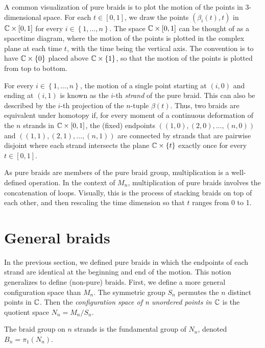 A common visualization of pure braids is to plot the motion of the points in 3-dimensional space. For each $t\in [0,1]$, we draw the points $\left( \beta_i(t),t \right)$ in $\mathbb{C}\times[0,1]$ for every $i\in\left\{ 1,\dots,n \right\}$. The space $\mathbb{C}\times[0,1]$ can be thought of as a spacetime diagram, where the motion of the points is plotted in the complex plane at each time $t$, with the time being the vertical axis. The convention is to have $\mathbb{C}\times\left\{ 0 \right\}$ placed above $\mathbb{C}\times\left\{ 1 \right\}$, so that the motion of the points is plotted from top to bottom.


For every $i\in\left\{ 1,\dots,n \right\}$, the motion of a single point starting at $(i,0)$ and ending at $(i,1)$ is known as the $i$-th \textit{strand} of the pure braid. This can also be described by the $i$-th projection of the $n$-tuple $\beta(t)$. Thus, two braids are equivalent under homotopy if, for every moment of a continuous deformation of the $n$ strands in $\mathbb{C}\times [0,1]$, the (fixed) endpoints $((1,0),(2,0),\dots,(n,0))$ and $((1,1),(2,1),\dots,(n,1))$ are connected by strands that are pairwise disjoint where each strand intersects the plane $\mathbb{C}\times\left\{ t \right\}$ exactly once for every $t\in[0,1]$.

As pure braids are members of the pure braid group, multiplication is a well-defined operation. In the context of $M_n$, multiplication of pure braids involves the concatenation of loops. Visually, this is the process of stacking braids on top of each other, and then rescaling the time dimension so that $t$ ranges from 0 to 1.

\section{General braids}
In the previous section, we defined pure braids in which the endpoints of each strand are identical at the beginning and end of the motion. This notion generalizes to define (non-pure) braids. First, we define a more general configuration space than $M_n$. The symmetric group $S_n$ permutes the $n$ distinct points in $\mathbb{C}$. Then the \textit{configuration space of n unordered points in $\mathbb{C}$} is the quotient space $N_n = M_n/S_n$.

\begin{definition}
    The braid group on $n$ strands is the fundamental group of $N_n$, denoted $B_n = \pi_1(N_n)$.
\end{definition}

